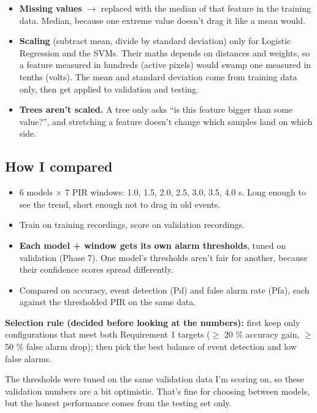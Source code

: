 \documentclass[11pt,a4paper]{article}
\providecommand{\tightlist}{\setlength{\itemsep}{0pt}\setlength{\parskip}{0pt}}
\begin{document}
\begin{itemize}
\tightlist
\item
  \textbf{Missing values} $\rightarrow$
  replaced with the median of
  that feature in the training
  data. Median, because one
  extreme value doesn't drag
  it like a mean would.
\item
  \textbf{Scaling} (subtract
  mean, divide by standard
  deviation) only for Logistic
  Regression and the SVMs.
  Their maths depends on
  distances and weights, so a
  feature measured in hundreds
  (active pixels) would swamp
  one measured in tenths
  (volts). The mean and
  standard deviation come from
  training data only, then get
  applied to validation and
  testing.
\item
  \textbf{Trees aren't
  scaled.} A tree only asks
  ``is this feature bigger
  than some value?'', and
  stretching a feature doesn't
  change which samples land on
  which side.
\end{itemize}

\hypertarget{how-i-compared}{%
\subsection{How I
compared}\label{how-i-compared}}

\begin{itemize}
\tightlist
\item
  6 models $\times$ 7 PIR windows:
  1.0, 1.5, 2.0, 2.5, 3.0,
  3.5, 4.0 s. Long enough to
  see the trend, short enough
  not to drag in old events.
\item
  Train on training
  recordings, score on
  validation recordings.
\item
  \textbf{Each model + window
  gets its own alarm
  thresholds}, tuned on
  validation (Phase 7). One
  model's thresholds aren't
  fair for another, because
  their confidence scores
  spread differently.
\item
  Compared on accuracy, event
  detection (Pd) and false
  alarm rate (Pfa), each
  against the thresholded PIR
  on the same data.
\end{itemize}

\textbf{Selection rule
(decided before looking at the
numbers):} first keep only
configurations that meet both
Requirement 1 targets ($\geq$ 20 \%
accuracy gain, $\geq$ 50 \% false
alarm drop); then pick the
best balance of event
detection and low false
alarms.

The thresholds were tuned on
the same validation data I'm
scoring on, so these
validation numbers are a bit
optimistic. That's fine for
choosing between models, but
the honest performance comes
from the testing set only.
\end{document}
